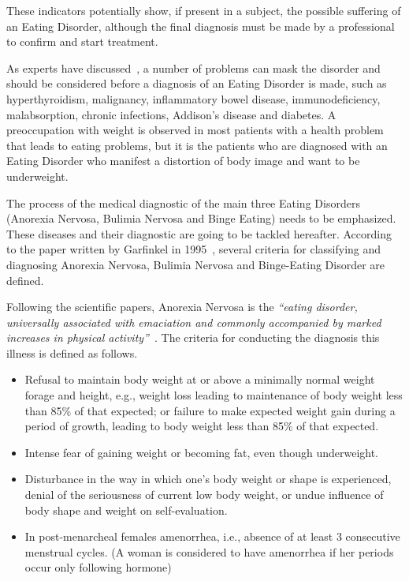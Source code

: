 These indicators potentially show, if present in a subject, the possible suffering of an Eating Disorder, although the final diagnosis must be made by a professional to confirm and start treatment. 


As experts have discussed~\cite{pritts2003diagnosis}, a number of problems can mask the disorder and should be considered before a diagnosis of an Eating Disorder is made, such as hyperthyroidism, malignancy, inflammatory bowel disease, immunodeficiency, malabsorption, chronic infections, Addison's disease and diabetes. A preoccupation with weight is observed in most patients with a health problem that leads to eating problems, but it is the patients who are diagnosed with an Eating Disorder who manifest a distortion of body image and want to be underweight.

The process of the medical diagnostic of the main three Eating Disorders (Anorexia Nervosa, Bulimia Nervosa and Binge Eating) needs to be emphasized. These diseases and their diagnostic are going to be tackled hereafter. According to the paper written by Garfinkel in 1995~\cite{garfinkel1995views}, several criteria for classifying and diagnosing Anorexia Nervosa, Bulimia Nervosa and Binge-Eating Disorder are defined.


Following the scientific papers, Anorexia Nervosa is the \textit{``eating disorder, universally associated with emaciation and commonly accompanied by marked increases in physical activity''}~\cite{bulik2005anorexia}. The criteria for conducting the diagnosis this illness is defined as follows.
\begin{itemize}
    \item Refusal to maintain body weight at or above a minimally normal weight forage and height, e.g., weight loss leading to maintenance of body weight less than 85\% of that expected; or failure to make expected weight gain during a period of growth, leading to body weight less than 85\% of that expected.
    \item Intense fear of gaining weight or becoming fat, even though underweight.
    \item Disturbance in the way in which one's body weight or shape is experienced, denial of the seriousness of current low body weight, or undue influence of body shape and weight on self-evaluation.
    \item In post-menarcheal females amenorrhea, i.e., absence of at least 3 consecutive menstrual cycles. (A woman is considered to have amenorrhea if her periods occur only following hormone)
\end{itemize}

